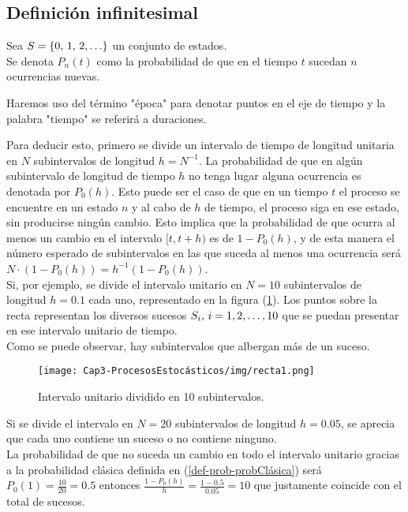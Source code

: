 \subsection{Definición infinitesimal}
    Sea $S=\{0,\thinspace 1,\thinspace 2,\ldots\}$ un conjunto de estados.\\Se denota $P_n(t)$ como la probabilidad de que en el tiempo $t$ sucedan $n$ ocurrencias nuevas.
    \begin{Obs}
    Haremos uso del término "época" para denotar puntos en el eje de tiempo y la palabra "tiempo" se referirá a duraciones.
    \end{Obs}
    Para deducir esto, primero se divide un intervalo de tiempo de longitud unitaria en $N$ subintervalos de longitud $h=N^{-1}$.
    La probabilidad de que en algún subintervalo de longitud de tiempo $h$ no tenga lugar alguna ocurrencia es denotada por $P_0(h)$. 
    Esto puede ser el caso de que en un tiempo $t$ el proceso se encuentre en un estado $n$ y al cabo de $h$ de tiempo, el proceso siga en ese estado, sin producirse ningún cambio. Esto implica que la probabilidad de que ocurra al menos un cambio en el intervalo $[t,t+h)$ es de  $1-P_0(h)$, y de esta manera el número esperado de subintervalos en las que suceda al menos una ocurrencia será $N\cdot(1-P_0(h))=h^{-1}(1-P_0(h))$.
    \\Si, por ejemplo, se divide el intervalo unitario en $N=10$ subintervalos de longitud $h=0.1$ cada uno, representado en la figura (\ref{fig-procesoPoison-recta1}). Los puntos sobre la recta representan los diversos sucesos $S_i,\thinspace i=1,2,\ldots,10$ que se puedan presentar en ese intervalo unitario de tiempo.\\ Como se puede observar, hay subintervalos que albergan más de un suceso.
    \begin{center}
        \begin{figure}[htb]
            \texttt{[image: Cap3-ProcesosEstocásticos/img/recta1.png]}
            \caption{Intervalo unitario dividido en 10 subintervalos.}
            \label{fig-procesoPoison-recta1}
            \vspace*{0.05in}
        \end{figure}
    \end{center}
    Si se divide el intervalo en $N=20$ subintervalos de longitud $h=0.05$, se aprecia que cada uno contiene un suceso o no contiene ninguno.\\
    La probabilidad de que no suceda un cambio en todo el intervalo unitario gracias a la probabilidad clásica definida en (\ref{def-prob-probClásica}) será $P_0(1)=\frac{10}{20}=0.5$ entonces $\frac{1-P_0(h)}{h}=\frac{1-0.5}{0.05}=10$ que justamente coincide con el total de sucesos.\\
